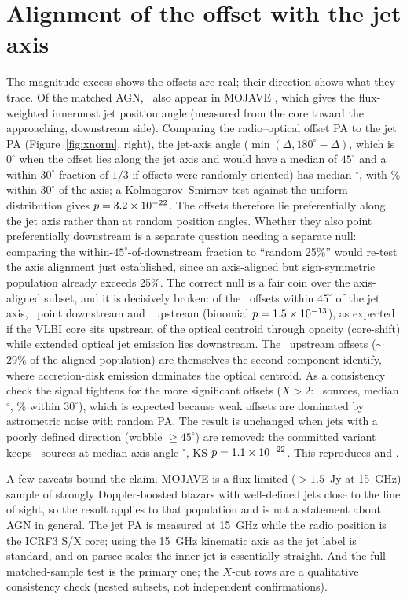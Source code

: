\documentclass[twocolumn]{aastex631}
\begin{document}
\section{Alignment of the offset with the jet axis}
The magnitude excess shows the offsets are real; their direction shows what they trace. Of the
matched AGN, \offJetN\ also appear in MOJAVE \citep{lister2021}, which gives the flux-weighted innermost
jet position angle (measured from the core toward the approaching, downstream side). Comparing the
radio--optical offset PA to the jet PA (Figure~\ref{fig:xnorm}, right), the jet-axis angle
($\min(\Delta,180^\circ-\Delta)$, which is $0^\circ$ when the offset lies along the jet axis and would
have a median of $45^\circ$ and a within-$30^\circ$ fraction of $1/3$ if offsets were randomly oriented)
has median \offJetMedAxis$^\circ$, with \offJetFracAxis\% within $30^\circ$ of the axis; a
Kolmogorov--Smirnov test against the uniform distribution gives $p=3.2\times10^{-22}$. The offsets
therefore lie preferentially along the jet axis rather than at random position angles. Whether
they also point preferentially downstream is a separate question needing a separate null:
comparing the within-$45^\circ$-of-downstream fraction to ``random 25\%'' would re-test the axis
alignment just established, since an axis-aligned but sign-symmetric population already exceeds
25\%. The correct null is a fair coin over the axis-aligned subset, and it is decisively broken:
of the \offNaligned\ offsets within $45^\circ$ of the jet axis, \offNdown\ point downstream and
\offNup\ upstream (binomial $p=1.5\times10^{-13}$), as expected if the VLBI core sits upstream of the
optical centroid through opacity (core-shift) while extended optical jet emission lies downstream.
The \offNup\ upstream offsets ($\sim$29\% of the aligned population) are themselves the second
component \citet{plavin2019} identify, where accretion-disk emission dominates the optical
centroid. As a consistency check the signal tightens for the more significant offsets ($X>2$:
\offJetNsig\ sources, median \offJetMedAxisSig$^\circ$, \offJetFracAxisSig\% within $30^\circ$),
which is expected because weak offsets are dominated by astrometric noise with random PA. The
result is unchanged when jets with a poorly defined direction (wobble $\geq45^\circ$) are removed:
the committed variant keeps \offGoodjetN\ sources at median axis angle \offGoodjetMedAxis$^\circ$,
KS $p=1.1\times10^{-22}$. This reproduces \citet{kovalev2017} and \citet{plavin2019}.

A few caveats bound the claim. MOJAVE is a flux-limited ($>1.5$~Jy at 15~GHz) sample of strongly
Doppler-boosted blazars with well-defined jets close to the line of sight, so the result applies to that
population and is not a statement about AGN in general. The jet PA is measured at 15~GHz while the radio
position is the ICRF3 S/X core; using the 15~GHz kinematic axis as the jet label is standard, and on
parsec scales the inner jet is essentially straight. And the full-matched-sample test is the primary
one; the $X$-cut rows are a qualitative consistency check (nested subsets, not independent
confirmations).
\end{document}
